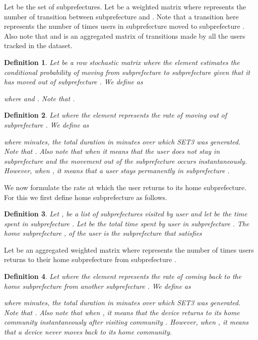 \documentclass[review]{elsarticle}
\begin{document}
Let  be the set of subprefectures. Let  be a weighted matrix where  represents the number of transition between subprefecture  and . Note that a transition here represents the number of times users in subprefecture  moved to subprefecture . Also note that  and  is an aggregated matrix of transitions made by all the users tracked in the  dataset.

\newtheorem{definition}{Definition}



\begin{definition}\label{defmpv}
	Let  be a row stochastic matrix where the element  estimates the conditional probability of moving from subprefecture  to subprefecture  given that it has moved out of subprefecture . We define   as
	
	where  and . Note that .
\end{definition}

\begin{definition}\label{defmprv}
Let  where the element  represents the rate of moving out of subprefecture . We define   as

where  minutes, the total duration in minutes over which SET3 was generated. Note that . Also note that when  it means that the user does not stay in subprefecture  and the movement out of the subprefecture occurs instantaneously. However, when , it means that a user stays permanently in subprefecture .
\end{definition}

We now formulate the rate at which the user returns to its home subprefecture. For this we first define home subprefecture as follows.

\begin{definition}\label{defhome}
Let , be a list of subprefectures visited by user  and let   be the time spent in subprefecture . Let   be the total time spent by user  in subprefecture . The home subprefecture , of the user  is the subprefecture that satisfies

\end{definition}

Let  be an aggregated weighted matrix where  represents the number of times users returns to their home subprefecture  from subprefecture .

\begin{definition}\label{defmprrv}
Let  where the element  represents the rate of coming back to the home subprefecture  from another subprefecture . We define   as
	
where  minutes, the total duration in minutes over which SET3 was generated. Note that . Also note that when , it means that the device returns to its home community  instantaneously after visiting community . However, when , it means that a device never moves back to its home community.
\end{definition}
\end{document}
